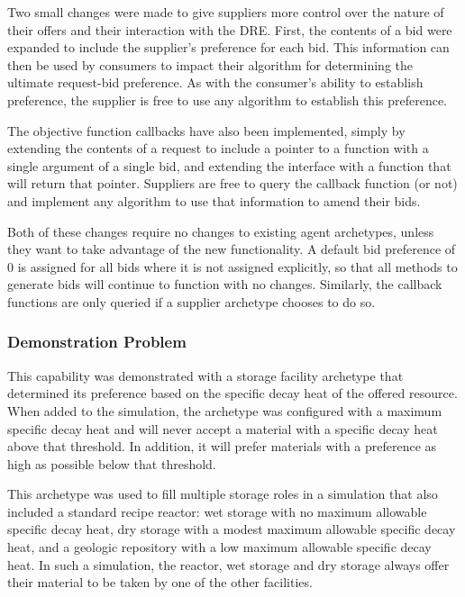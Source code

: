 Two small changes were made to give suppliers more control over the nature of
their offers and their interaction with the \gls{DRE}.  First, the contents of
a bid were expanded to include the supplier's preference for each bid.  This
information can then be used by consumers to impact their algorithm for
determining the ultimate request-bid preference.  As with the consumer's
ability to establish preference, the supplier is free to use any algorithm to
establish this preference.

The objective function callbacks have also been implemented, simply by
extending the contents of a request to include a pointer to a function with a
single argument of a single bid, and extending the interface with a function
that will return that pointer.  Suppliers are free to query the callback
function (or not) and implement any algorithm to use that information to amend
their bids.

Both of these changes require no changes to existing agent archetypes, unless
they want to take advantage of the new functionality.  A default bid
preference of 0 is assigned for all bids where it is not assigned explicitly,
so that all methods to generate bids will continue to function with no
changes.  Similarly, the callback functions are only queried if a supplier
archetype chooses to do so.


\subsubsection{Demonstration Problem}


This capability was demonstrated with a storage facility archetype that
determined its preference based on the specific decay heat of the offered
resource.  When added to the simulation, the archetype was configured with a
maximum specific decay heat and will never accept a material with a specific
decay heat above that threshold.  In addition, it will prefer materials with a
preference as high as possible below that threshold.

This archetype was used to fill multiple storage roles in a simulation that
also included a standard recipe reactor: wet storage with no maximum allowable
specific decay heat, dry storage with a modest maximum allowable specific
decay heat, and a geologic repository with a low maximum allowable specific
decay heat.  In such a simulation, the reactor, wet storage and dry storage
always offer their material to be taken by one of the other facilities.

